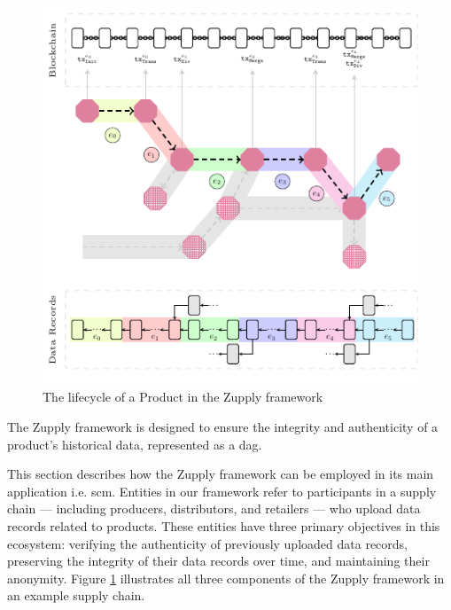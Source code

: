 \begin{figure}[h]
    \centering
    \includegraphics[width=.65\linewidth]{Figures/ZupplyNetwork}
    \caption{The lifecycle of a Product in the Zupply framework}
    \label{fig:enter-label}
\end{figure}

The Zupply framework is designed to ensure the integrity and authenticity of a product's historical data, represented as a \gls{dag}. 

This section describes how the Zupply framework can be employed in its main application i.e. \gls{scm}. Entities in our framework refer to participants in a supply chain — including producers, distributors, and retailers — who upload data records related to products. These entities have three primary objectives in this ecosystem: verifying the authenticity of previously uploaded data records, preserving the integrity of their data records over time, and maintaining their anonymity. Figure \ref{fig:enter-label} illustrates all three components of the Zupply framework in an example supply chain.

